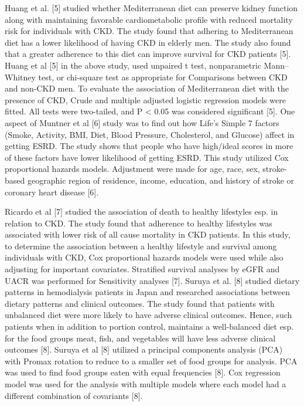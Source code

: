 \medskip
\noindent Huang et al. [5] studied whether Mediterranean diet can preserve kidney function along with maintaining favorable cardiometabolic profile with reduced mortality risk for individuals with CKD. The study found that adhering to Mediterranean diet has a lower likelihood of having CKD in elderly men. The study also found that a greater adherence to this diet can improve survival for CKD patients [5]. Huang et al [5] in the above study, used unpaired t test, nonparametric Mann–Whitney test, or chi-square test as appropriate for Comparisons between CKD and non-CKD men. To evaluate the association of Mediterranean diet with the presence of CKD, Crude and multiple adjusted logistic regression models were fitted. All tests were two-tailed, and P < 0.05 was considered significant [5]. One aspect of Muntner et al [6] study was to find out how Life’s Simple 7 factors (Smoke, Activity, BMI, Diet, Blood Pressure, Cholesterol, and Glucose) affect in getting ESRD. The study shows that people who have high/ideal scores in more of these factors have lower likelihood of getting ESRD. This study utilized Cox proportional hazards models. Adjustment were made for age, race, sex, stroke-based geographic region of residence, income, education, and history of stroke or coronary heart disease [6].


\medskip
\noindent  Ricardo et al [7] studied the association of death to healthy lifestyles esp. in relation to CKD. The study found that adherence to healthy lifestyles was associated with lower risk of all cause mortality in CKD patients. In this study, to determine the association between a healthy lifestyle and survival among individuals with CKD, Cox proportional hazards models were used while also adjusting for important covariates. Stratified survival analyses by eGFR and UACR was performed for Sensitivity analyses [7]. Suruya et al. [8] studied dietary patterns in hemodialysis patients in Japan and researched associations between dietary patterns and clinical outcomes. The study found that patients with unbalanced diet were more likely to have adverse clinical outcomes. Hence, such patients when in addition to portion control, maintains a well-balanced diet esp. for the food groups meat, fish, and vegetables will have less adverse clinical outcomes [8]. Suruya et al [8] utilized a principal components analysis (PCA) with Promax rotation to reduce to a smaller set of food groups for analysis. PCA was used to find food groups eaten with equal frequencies [8]. Cox regression model was used for the analysis with multiple models where each model had a different combination of covariants [8].

